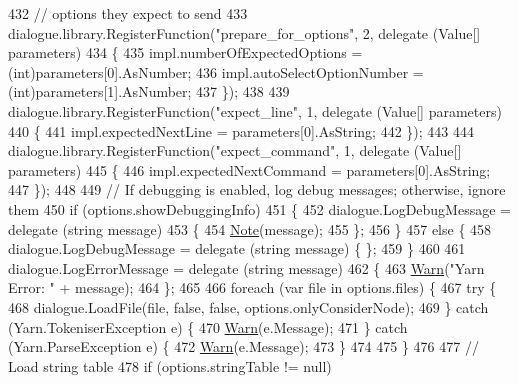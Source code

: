 \begin{DoxyCode}
432             \textcolor{comment}{// options they expect to send}
433             dialogue.library.RegisterFunction(\textcolor{stringliteral}{"prepare\_for\_options"}, 2, delegate (Value[] parameters)
434             \{
435                 impl.numberOfExpectedOptions = (int)parameters[0].AsNumber;
436                 impl.autoSelectOptionNumber = (int)parameters[1].AsNumber;
437             \});
438 
439             dialogue.library.RegisterFunction(\textcolor{stringliteral}{"expect\_line"}, 1, delegate (Value[] parameters)
440             \{
441                 impl.expectedNextLine = parameters[0].AsString;
442             \});
443 
444             dialogue.library.RegisterFunction(\textcolor{stringliteral}{"expect\_command"}, 1, delegate (Value[] parameters)
445             \{
446                 impl.expectedNextCommand = parameters[0].AsString;
447             \});
448 
449             \textcolor{comment}{// If debugging is enabled, log debug messages; otherwise, ignore them}
450             \textcolor{keywordflow}{if} (options.showDebuggingInfo)
451             \{
452                 dialogue.LogDebugMessage = delegate (\textcolor{keywordtype}{string} message)
453                 \{
454                     \hyperlink{a00189_a939cc9e943c574b36c6af93e9c772702}{Note}(message);
455                 \};
456             \}
457             \textcolor{keywordflow}{else} \{
458                 dialogue.LogDebugMessage = delegate (\textcolor{keywordtype}{string} message) \{ \};
459             \}
460 
461             dialogue.LogErrorMessage = delegate (\textcolor{keywordtype}{string} message)
462             \{
463                 \hyperlink{a00189_a979bb6f049b6c5294f745a19e24ddd9d}{Warn}(\textcolor{stringliteral}{"Yarn Error: "} + message);
464             \};
465 
466             \textcolor{keywordflow}{foreach} (var file \textcolor{keywordflow}{in} options.files) \{
467                 \textcolor{keywordflow}{try} \{
468                     dialogue.LoadFile(file, \textcolor{keyword}{false}, \textcolor{keyword}{false}, options.onlyConsiderNode);
469                 \} \textcolor{keywordflow}{catch} (Yarn.TokeniserException e) \{
470                     \hyperlink{a00189_a979bb6f049b6c5294f745a19e24ddd9d}{Warn}(e.Message);
471                 \} \textcolor{keywordflow}{catch} (Yarn.ParseException e) \{
472                     \hyperlink{a00189_a979bb6f049b6c5294f745a19e24ddd9d}{Warn}(e.Message);
473                 \}
474 
475             \}
476 
477             \textcolor{comment}{// Load string table}
478             \textcolor{keywordflow}{if} (options.stringTable != null)

\end{DoxyCode}
